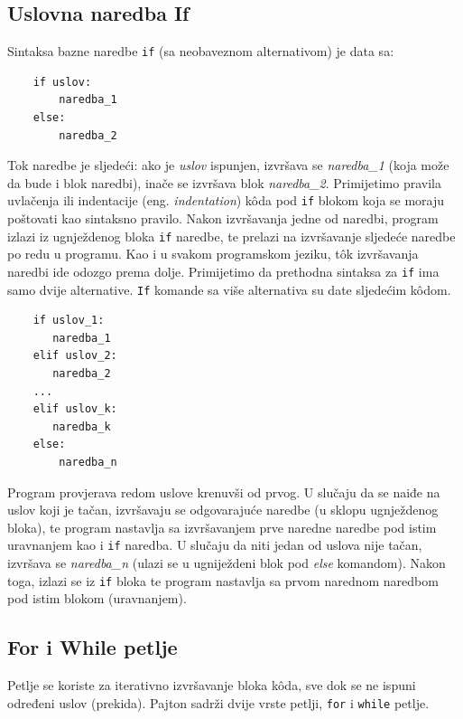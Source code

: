 \subsection{Uslovna naredba If}

Sintaksa bazne naredbe \texttt{if} (sa neobaveznom alternativom) je data sa:
\begin{verbatim}
    if uslov:
        naredba_1
    else:
        naredba_2
\end{verbatim}

Tok naredbe je sljedeći: ako je \emph{uslov} ispunjen, izvršava se \textit{naredba\_1} (koja može da bude i blok naredbi), inače se izvršava blok \textit{naredba\_2}. Primijetimo pravila uvlačenja ili indentacije (eng. \textit{indentation}) k\^oda pod \texttt{if} blokom koja se moraju poštovati kao sintaksno pravilo. Nakon izvršavanja jedne od naredbi, program izlazi iz ugnježdenog bloka \texttt{if} naredbe, te prelazi na izvršavanje sljedeće naredbe po redu u programu. Kao i u svakom programskom jeziku, t\^ok izvršavanja naredbi ide  odozgo prema dolje. Primi\-jetimo da prethodna sintaksa za \texttt{if} ima samo dvije alternative. \texttt{If} komande sa više alternativa su date sljedećim k\^odom. 

 \begin{verbatim}
 	if uslov_1:
 	   naredba_1
 	elif uslov_2:
 	   naredba_2
 	...
 	elif uslov_k:
 	   naredba_k
 	else:
 	    naredba_n
 \end{verbatim}

Program provjerava redom uslove krenuvši od prvog. U slučaju da se naiđe na  uslov koji je tačan, izvršavaju se odgovarajuće naredbe (u sklopu ugnježdenog  bloka), te program  nastavlja sa izvršavanjem prve naredne naredbe pod istim uravnanjem kao i \texttt{if} naredba. U slučaju da niti jedan od uslova nije tačan, izvršava se \emph{naredba\_n} (ulazi se u ugniježdeni blok pod \textit{else} komandom). Nakon toga, izlazi se iz \texttt{if} bloka te program nastavlja sa prvom narednom naredbom pod istim blokom (uravnanjem).  

\subsection{For i While petlje }

Petlje se koriste za iterativno izvršavanje bloka k\^oda, sve dok se ne ispuni određeni uslov (prekida). Pajton sadrži dvije vrste petlji, \texttt{for} i \texttt{while} petlje.\\ 


